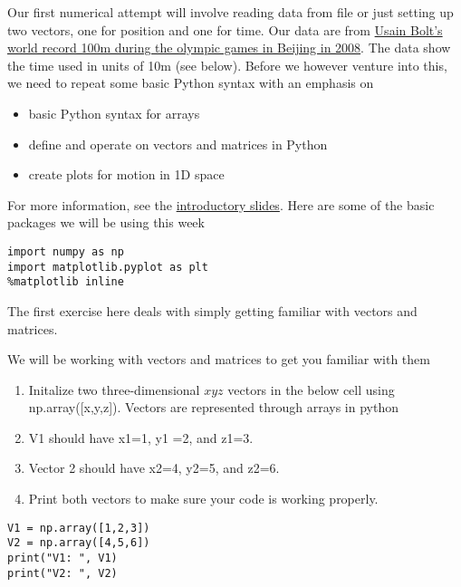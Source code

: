 \documentclass[%
oneside,                 %
final,                   %
10pt]{article}
\begin{document}
Our first numerical attempt will involve reading data from file or
just setting up two vectors, one for position and one for time. Our data are from 
\href{{https://www.youtube.com/watch?v=93dC0o2aHto}}{Usain Bolt's world record 100m during the olympic games in Beijing in
2008}. The data show the time used in units of 10m (see below). Before we however
venture into this, we need to repeat some basic Python syntax with an
emphasis on

\begin{itemize}
\item basic Python syntax for arrays

\item define and operate on vectors and matrices in Python

\item create plots for motion in 1D space
\end{itemize}

\noindent
For more information, see the \href{{https://mhjensen.github.io/Physics321/doc/pub/Introduction/html/Introduction.html}}{introductory slides}.
Here are some of the basic packages we will be using this week
\begin{verbatim}
import numpy as np 
import matplotlib.pyplot as plt
%matplotlib inline
\end{verbatim}


The first exercise here deals with simply getting familiar with vectors and matrices.

We will be working with vectors and matrices to get you familiar with them

\begin{enumerate}
\item Initalize two three-dimensional $xyz$ vectors in the below cell using np.array([x,y,z]). Vectors are represented through arrays in python

\item V1 should have x1=1, y1 =2, and z1=3. 

\item Vector 2 should have x2=4, y2=5,  and z2=6. 

\item Print both vectors to make sure your code is working properly.
\end{enumerate}

\noindent
\begin{verbatim}
V1 = np.array([1,2,3])
V2 = np.array([4,5,6])
print("V1: ", V1)
print("V2: ", V2)
\end{verbatim}
\end{document}
